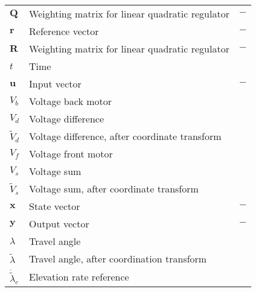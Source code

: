 \begin{table}[h!]
\begin{tabular}{lll}
		$\bm{Q}$    & Weighting matrix for linear quadratic regulator   & $-$                         \\
		$\bm{r}$    & Reference vector                                  & $-$                         \\
		$\bm{R}$    & Weighting matrix for linear quadratic regulator   & $-$                         \\
		$t$         & Time                                              & \second                     \\
		$\bm{u}$    & Input vector                                      & $-$                         \\
		$V_b$       & Voltage back motor                                & \volt                       \\
		$V_d$       & Voltage difference                                & \volt                       \\
		$\tilde{V}_d$     & Voltage difference, after coordinate transform  & \volt                       \\
		$V_f$       & Voltage front motor                               & \volt                       \\
		$V_s$       & Voltage sum                                       & \volt                       \\
		$\tilde{V}_s$     & Voltage sum, after coordinate transform     & \volt                       \\
		$\bm{x}$    & State vector                                      & $-$                         \\
		$\bm{y}$    & Output vector                                     & $-$                         \\
  		$\lambda$         & Travel angle                                & \rad                        \\
		$\tilde{\lambda}$ & Travel angle, after coordination transform  & \rad                        \\
		$\dot{\tilde{\lambda}}_c$ & Elevation rate reference            & \rad\per\second             \\
		
		\bottomrule
	\end{tabular}
\label{tab:parameters}
\end{table}

